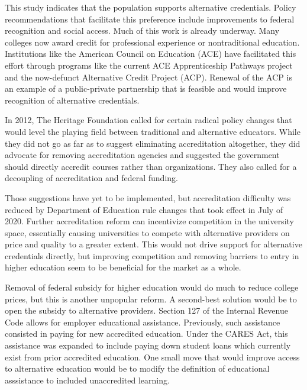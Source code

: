 \documentclass[review]{elsarticle}
\begin{document}
This study indicates that the population supports alternative credentials.
Policy recommendations that facilitate this preference include improvements to federal recognition and social access.
Much of this work is already underway.
Many colleges now award credit for professional experience or nontraditional education.
Institutions like the American Council on Education (ACE)
have facilitated this effort through programs like the current ACE Apprenticeship Pathways project
and the now-defunct Alternative Credit Project (ACP). %
Renewal of the ACP is an example of a public-private partnership that is feasible and would improve recognition of alternative credentials.

In 2012, The Heritage Foundation called for certain radical policy changes that would level the playing field between traditional and alternative educators.
While they did not go as far as to suggest eliminating accreditation altogether,
they did advocate for removing accreditation agencies and suggested the government should directly accredit courses rather than organizations. %
They also called for a decoupling of accreditation and federal funding.

Those suggestions have yet to be implemented, but accreditation difficulty was reduced by Department of Education rule changes that
took effect in July of 2020. %
Further accreditation reform can incentivize competition in the university space,
essentially causing universities to compete with alternative providers on price and quality to a greater extent.
This would not drive support for alternative credentials directly, but improving competition and removing
barriers to entry in higher education seem to be beneficial for the market as a whole.


Removal of federal subsidy for higher education would do much to reduce college prices, but this is another unpopular reform.
A second-best solution would be to open the subsidy to alternative providers.
Section 127 of the Internal Revenue Code allows for employer educational assistance.
Previously, such assistance consisted in paying for new accredited education.
Under the CARES Act, this assistance was expanded to include paying down student loans which currently exist from prior accredited education.
One small move that would improve access to alternative education would be to modify the definition of educational asssistance to included unaccredited learning.
\end{document}
